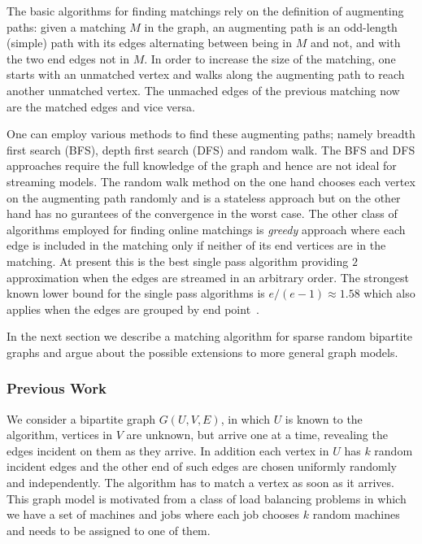 \documentclass{scrartcl}
\begin{document}
The basic algorithms for finding matchings rely on the definition of augmenting paths:
given a matching $M$ in the graph, an augmenting path is an odd-length
(simple) path with its edges alternating between being in $M$
and not, and with the two end edges not in $M$. In order to increase the size of the matching, one starts with an unmatched vertex and walks along the augmenting path to reach another unmatched vertex. The unmached edges of the previous matching now are the matched edges and vice versa.

One can employ various methods to find these augmenting paths; namely breadth first search (BFS), depth first search (DFS) and random walk. The BFS and DFS approaches require the full knowledge of the graph and hence are not ideal for streaming models. The random walk method on the one hand chooses each vertex on the augmenting path randomly and is a stateless approach but on the other hand has no gurantees of the convergence in the worst case.
The other class of algorithms employed for finding online matchings is \emph{greedy} approach where each edge is included in the matching only if neither of its end vertices are in the matching. At present this is the best single pass algorithm providing $2$ approximation when the edges are streamed in an arbitrary order. The strongest known lower bound for the single pass algorithms is $e/(e-1)\approx 1.58$ which also applies when the edges are grouped by end point~\cite{boundsKap,Goel}.

In the next section we describe  a matching algorithm for sparse random bipartite graphs and argue about the possible extensions to more general graph models. 


\subsubsection{Previous Work}
We consider a bipartite graph $G(U,V,E)$, in which $U$ is known to the algorithm, vertices in $V$ are
unknown, but arrive one at a time, revealing the edges incident on
them as they arrive. In addition each vertex in $U$ has $k$ random incident edges and the other end of such edges are chosen uniformly randomly and independently. The algorithm has to match a vertex
as soon as it arrives. This graph model is motivated from a class of load balancing problems in which we have a set of machines and jobs where each job chooses $k$ random machines and needs to be assigned to one of them.
\end{document}
